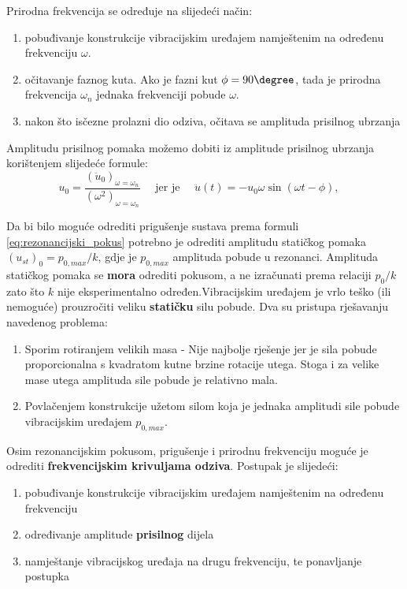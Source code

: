 Prirodna frekvencija se određuje na slijedeći način:
\begin{enumerate}
    \item pobuđivanje konstrukcije vibracijskim uređajem namještenim na
        određenu frekvenciju $\omega$.
    \item očitavanje faznog kuta. Ako je fazni kut $\phi = 90\degree$, tada je
        prirodna frekvencija $\omega_n$ jednaka frekvenciji pobude $\omega$.
    \item nakon što isčezne prolazni dio odziva, očitava se amplituda prisilnog ubrzanja
\end{enumerate}

Amplitudu prisilnog pomaka možemo dobiti iz amplitude prisilnog ubrzanja korištenjem
slijedeće formule:
\begin{equation}
    u_0=\frac{(\ddot{u}_0)_{\omega=\omega_n}}{(\omega^2)_{\omega=\omega_n}} \quad
    \text{ jer je } \quad
    \ddot{u}(t) = -u_0\omega\sin(\omega t -\phi), \quad
\end{equation}

Da bi bilo moguće odrediti prigušenje sustava prema formuli \eqref{eq:rezonancijski_pokus} 
potrebno je odrediti amplitudu statičkog pomaka $(u_{st})_0=p_{0,max}/k$, gdje je
$p_{0,max}$ amplituda pobude u rezonanci. Amplituda statičkog pomaka se
\textbf{mora} odrediti pokusom, a ne izračunati prema relaciji $p_0/k$ zato što $k$
nije eksperimentalno određen.Vibracijskim uređajem je vrlo teško (ili
nemoguće) prouzročiti veliku \textbf{statičku} silu pobude. Dva su pristupa rješavanju
navedenog problema:
\begin{enumerate}
    \item Sporim rotiranjem velikih masa - Nije najbolje rješenje jer je sila pobude
        proporcionalna s kvadratom kutne brzine rotacije utega. Stoga i za velike mase 
        utega amplituda sile pobude je relativno mala.
    \item Povlačenjem konstrukcije užetom silom koja je jednaka amplitudi sile
        pobude vibracijskim uređajem $p_{0,max}$.
\end{enumerate}

Osim rezonancijskim pokusom, prigušenje i prirodnu frekvenciju moguće je
odrediti \textbf{frekvencijskim krivuljama odziva}. Postupak je slijedeći:
\begin{enumerate}
    \item pobuđivanje konstrukcije vibracijskim uređajem namještenim na određenu
        frekvenciju
    \item određivanje amplitude \textbf{prisilnog} dijela 
    \item namještanje vibracijskog uređaja na drugu frekvenciju, te ponavljanje
        postupka%
\end{enumerate}

